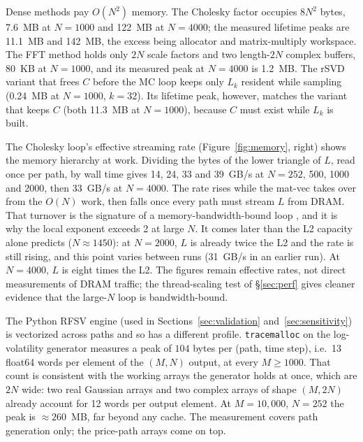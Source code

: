 Dense methods pay $O(N^2)$ memory.  The Cholesky factor occupies $8N^2$ bytes, 7.6~MB at
$N = 1000$ and 122~MB at $N = 4000$; the measured lifetime peaks are 11.1~MB and
142~MB, the excess being allocator and matrix-multiply workspace.  The FFT method
holds only $2N$ scale factors and two length-$2N$ complex buffers, 80~KB at
$N = 1000$, and its measured peak at $N = 4000$ is 1.2~MB.  The rSVD variant that frees
$C$ before the MC loop keeps only $L_k$ resident while sampling (0.24~MB at $N = 1000$,
$k = 32$).  Its lifetime peak, however, matches the variant that keeps $C$ (both 11.3~MB at
$N = 1000$), because $C$ must exist while $L_k$ is built.

The Cholesky loop's effective streaming rate (Figure~\ref{fig:memory}, right) shows
the memory hierarchy at work.  Dividing the bytes of the lower triangle of $L$, read
once per path, by wall time gives 14, 24, 33 and 39~GB/s at $N = 252$, 500, 1000 and
2000, then 33~GB/s at $N = 4000$.  The rate rises while the mat-vec takes over from the
$O(N)$ work, then falls once every path must stream $L$ from DRAM.  That turnover is the
signature of a memory-bandwidth-bound loop \citep{drepper2007every}, and it is why the
local exponent exceeds 2 at large $N$.  It comes later than the L2 capacity alone
predicts ($N \approx 1450$): at $N = 2000$, $L$ is already twice the L2 and the rate is
still rising, and this point varies between runs (31~GB/s in an earlier run).  At
$N = 4000$, $L$ is eight times the L2.  The figures remain effective rates, not direct
measurements of DRAM traffic; the thread-scaling test of §\ref{sec:perf} gives cleaner
evidence that the large-$N$ loop is bandwidth-bound.

The Python RFSV engine (used in Sections~\ref{sec:validation}
and~\ref{sec:sensitivity}) is vectorized across paths and so has a different
profile.  \texttt{tracemalloc} on the log-volatility generator measures a peak of
$104$ bytes per (path, time step), i.e.\ 13 float64 words per element of the
$(M, N)$ output, at every $M \geq 1000$.  That count is consistent with the working
arrays the generator holds at once, which are $2N$ wide: two real Gaussian arrays
and two complex arrays of shape $(M, 2N)$ already account for 12 words per output
element.  At $M = 10{,}000$, $N = 252$ the peak is $\approx 260$~MB, far beyond any
cache.  The measurement covers path generation only; the price-path arrays come on
top.

